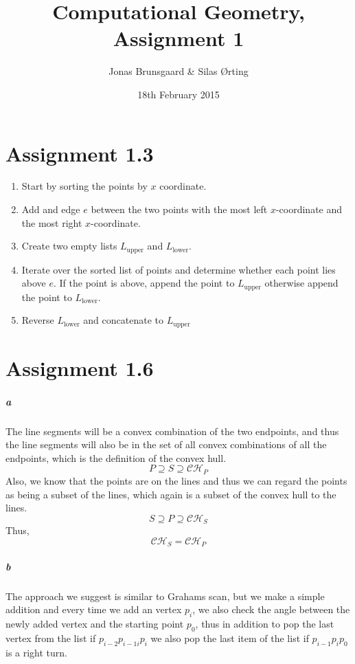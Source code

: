 \documentclass[10pt,a4paper,final,oneside,openany,article]{memoir}
\title{Computational Geometry, Assignment 1}
\author{
    Jonas Brunsgaard \& Silas Ørting
}
\date{18th February 2015}
\begin{document}
\maketitle

\chapter*{Assignment 1.3}
\begin{enumerate}
  \item Start by sorting the points by $x$ coordinate.
  \item Add and edge $e$ between the two points with the most left
    $x$-coordinate and the most right $x$-coordinate.
  \item Create two empty lists $L_{\textrm{upper}}$ and $L_{\textrm{lower}}$.
  \item Iterate over the sorted list of points and determine whether each point
    lies above $e$. If the point is above, append the point to
    $L_{\textrm{upper}}$ otherwise append the point to $L_{\textrm{lower}}$.
  \item Reverse $L_{\textrm{lower}}$ and concatenate to $L_{\textrm{upper}}$
\end{enumerate}

\chapter*{Assignment 1.6}
\paragraph{a} The line segments will be a convex combination of the two
endpoints, and thus the line segments will also be in the set of all convex
combinations of all the endpoints, which is the definition of the convex hull.
$$ P \supseteq S \supseteq \mathcal{CH}_P $$
Also, we know that the points are on the lines and thus we can regard the
points as being a subset of the lines, which again is a subset of the convex
hull to the lines.
$$ S \supseteq P \supseteq \mathcal{CH}_S $$
Thus,
$$ \mathcal{CH}_S = \mathcal{CH}_P $$
\paragraph{b} The approach we suggest is similar to Grahams scan, but we make
a simple addition and every time we add an vertex $p_{i}$, we also check the
angle between the newly added vertex and the starting point $p_0$, thus in
addition to pop the last vertex from the list if $p_{i-2}p_{i-1i}p_{i}$ we
also pop the last item of the list if $p_{i-1}p_{i}p_{0}$ is a right turn.
\end{document}

